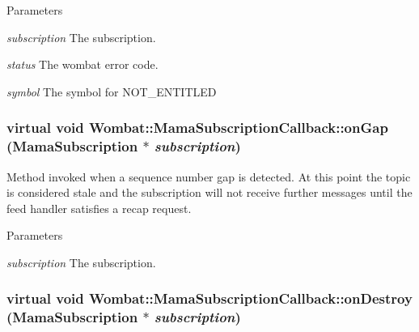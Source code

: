 \begin{DoxyParams}{Parameters}
\item[{\em subscription}]The subscription. \item[{\em status}]The wombat error code. \item[{\em symbol}]The symbol for NOT\_\-ENTITLED \end{DoxyParams}
\hypertarget{classWombat_1_1MamaSubscriptionCallback_adfc75192ce4b29bc9ba32daaadd62c88}{
\subsubsection[{onGap}]{\setlength{\rightskip}{0pt plus 5cm}virtual void Wombat::MamaSubscriptionCallback::onGap ({\bf MamaSubscription} $\ast$ {\em subscription})}}
\label{classWombat_1_1MamaSubscriptionCallback_adfc75192ce4b29bc9ba32daaadd62c88}


Method invoked when a sequence number gap is detected. At this point the topic is considered stale and the subscription will not receive further messages until the feed handler satisfies a recap request.


\begin{DoxyParams}{Parameters}
\item[{\em subscription}]The subscription. \end{DoxyParams}
\hypertarget{classWombat_1_1MamaSubscriptionCallback_a6405ac3d7129e737429d129dfd90a510}{
\subsubsection[{onDestroy}]{\setlength{\rightskip}{0pt plus 5cm}virtual void Wombat::MamaSubscriptionCallback::onDestroy ({\bf MamaSubscription} $\ast$ {\em subscription})}}
\label{classWombat_1_1MamaSubscriptionCallback_a6405ac3d7129e737429d129dfd90a510}


